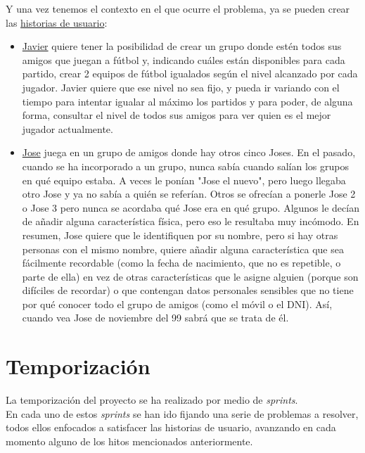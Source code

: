 Y una vez tenemos el contexto en el que ocurre el problema, ya se pueden crear las \href{https://github.com/manujurado1/SportsBar-IV/labels/user-stories}{historias de usuario}:

\begin{itemize}
    \item \href{https://github.com/manujurado1/SportsBar-IV/issues/107}{Javier} quiere tener la posibilidad de crear un grupo donde estén todos sus amigos que juegan a fútbol y, indicando cuáles están disponibles para cada partido, crear 2
    equipos de fútbol igualados según el nivel alcanzado por cada jugador. Javier quiere que ese nivel no sea fijo, y pueda ir variando con el tiempo para intentar igualar
    al máximo los partidos y para poder, de alguna forma, consultar el nivel de todos sus amigos para ver quien es el mejor jugador actualmente.
    \item \href{https://github.com/manujurado1/SportsBar-IV/issues/119}{Jose} juega en un grupo de amigos donde hay otros cinco Joses. En el pasado, cuando se ha incorporado a un grupo, nunca sabía cuando salían los grupos en qué equipo estaba. A veces le ponían "Jose el nuevo", pero luego llegaba otro Jose y ya no sabía a quién se referían. Otros se ofrecían a ponerle Jose 2 o Jose 3 pero nunca se acordaba qué Jose era en qué grupo. Algunos le decían de añadir alguna característica física, pero eso le resultaba muy incómodo.
    En resumen, Jose quiere que le identifiquen por su nombre, pero si hay otras personas con el mismo nombre, quiere añadir alguna característica que sea fácilmente recordable (como la fecha de nacimiento, que no es repetible, o parte de ella) en vez de otras características que le asigne alguien (porque son difíciles de recordar) o que contengan datos personales sensibles que no tiene por qué conocer todo el grupo de amigos (como el móvil o el DNI).
    Así, cuando vea Jose de noviembre del 99 sabrá que se trata de él.
\end{itemize}

\newpage
\section{Temporización}

La temporización del proyecto se ha realizado por medio de \textit{sprints}.\\

En cada uno de estos \textit{sprints} se han ido fijando una serie de problemas a resolver, todos ellos enfocados a satisfacer las historias de usuario, avanzando en cada momento
alguno de los hitos mencionados anteriormente.


